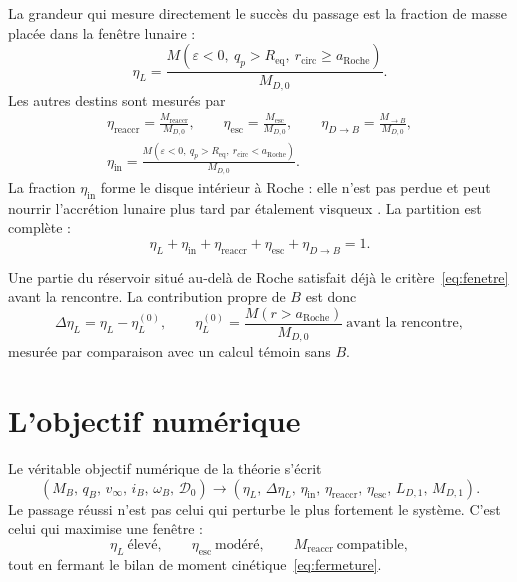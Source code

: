\documentclass[11pt,a4paper,openany]{report}
\newcommand{\Req}{R_{\mathrm{eq}}}
\newcommand{\aR}{a_{\mathrm{Roche}}}
\begin{document}
La grandeur qui mesure directement le succès du passage est la fraction de masse placée dans la
fenêtre lunaire :
\begin{equation}
\boxed{\;\eta_L=\frac{M\!\left(\varepsilon<0,\ q_p>\Req,\ r_{\mathrm{circ}}\ge\aR\right)}{M_{D,0}}.\;}
\label{eq:etaL}
\end{equation}
Les autres destins sont mesurés par
\begin{equation}
\begin{gathered}
\eta_{\mathrm{reaccr}}=\frac{M_{\mathrm{reaccr}}}{M_{D,0}},\qquad
\eta_{\mathrm{esc}}=\frac{M_{\mathrm{esc}}}{M_{D,0}},\qquad
\eta_{D\to B}=\frac{M_{\to B}}{M_{D,0}},\\[4pt]
\eta_{\mathrm{in}}=\frac{M(\varepsilon<0,\ q_p>\Req,\ r_{\mathrm{circ}}<\aR)}{M_{D,0}}.
\end{gathered}
\label{eq:etas}
\end{equation}
La fraction $\eta_{\mathrm{in}}$ forme le disque intérieur à Roche : elle n'est pas perdue et peut
nourrir l'accrétion lunaire plus tard par étalement visqueux \cite{SalmonCanup2012}. La partition
est complète :
\begin{equation}
\boxed{\;\eta_L+\eta_{\mathrm{in}}+\eta_{\mathrm{reaccr}}+\eta_{\mathrm{esc}}+\eta_{D\to B}=1.\;}
\label{eq:partition}
\end{equation}

Une partie du réservoir situé au-delà de Roche satisfait déjà le critère~\eqref{eq:fenetre} avant la
rencontre. La contribution propre de $B$ est donc
\begin{equation}
\Delta\eta_L=\eta_L-\eta_L^{(0)},\qquad
\eta_L^{(0)}=\frac{M(r>\aR)}{M_{D,0}}\ \text{avant la rencontre},
\label{eq:DeltaetaL}
\end{equation}
mesurée par comparaison avec un calcul témoin sans $B$.

\section{L'objectif numérique}

Le véritable objectif numérique de la théorie s'écrit
\begin{equation}
\boxed{\;\left(M_B,\,q_B,\,v_\infty,\,i_B,\,\omega_B,\,\mathcal{D}_0\right)\longrightarrow
\left(\eta_L,\,\Delta\eta_L,\,\eta_{\mathrm{in}},\,\eta_{\mathrm{reaccr}},\,\eta_{\mathrm{esc}},\,
L_{D,1},\,M_{D,1}\right).\;}
\label{eq:objectif}
\end{equation}
Le passage réussi n'est pas celui qui perturbe le plus fortement le système. C'est celui qui
maximise une fenêtre :
\begin{equation}
\boxed{\;\eta_L\ \text{élevé},\qquad \eta_{\mathrm{esc}}\ \text{modéré},\qquad
M_{\mathrm{reaccr}}\ \text{compatible},\;}
\label{eq:fenetre-succes}
\end{equation}
tout en fermant le bilan de moment cinétique~\eqref{eq:fermeture}.
\end{document}
